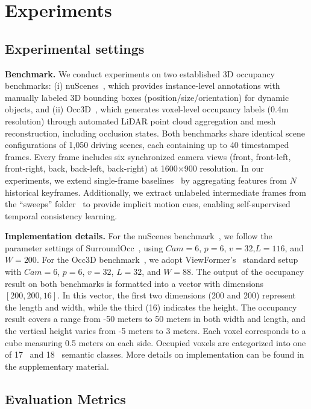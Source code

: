 \section{Experiments}
\label{sec:exp}
\subsection{Experimental settings}

\noindent\textbf{Benchmark.}  We conduct experiments on two established 3D occupancy benchmarks: (i) nuScenes~\cite{nuScenes}, which provides instance-level annotations with manually labeled 3D bounding boxes (position/size/orientation) for dynamic objects, and (ii) Occ3D~\cite{Occ3D}, which generates voxel-level occupancy labels (0.4m resolution) through automated LiDAR point cloud aggregation and mesh reconstruction, including occlusion states. Both benchmarks share identical scene configurations of 1,050 driving scenes, each containing up to 40 timestamped frames. Every frame includes six synchronized camera views (front, front-left, front-right, back, back-left, back-right) at 1600$\times$900 resolution. In our experiments, we extend single-frame baselines~\cite{MonoScene,surroundOcc,viewformer} by aggregating features from $N$ historical keyframes. Additionally, we extract unlabeled intermediate frames from the ``sweeps'' folder~\cite{nuScenes} to provide implicit motion cues, enabling self-supervised temporal consistency learning.

\noindent\textbf{Implementation details.} For the nuScenes benchmark~\cite{nuScenes}, we follow the parameter settings of SurroundOcc~\cite{surroundOcc}, using $Cam=6$, $p=6$, $v=32$,$L=116$, and $W=200$. For the Occ3D benchmark~\cite{Occ3D}, we adopt ViewFormer's~\cite{viewformer} standard setup with $Cam=6$, $p=6$, $v=32$, $L=32$, and $W=88$. The output of the occupancy result on both benchmarks is formatted into a vector with dimensions $[200, 200, 16]$. In this vector, the first two dimensions (200 and 200) represent the length and width, while the third (16) indicates the height. The occupancy result covers a range from -50 meters to 50 meters in both width and length, and the vertical height varies from -5 meters to 3 meters. Each voxel corresponds to a cube measuring 0.5 meters on each side. Occupied voxels are categorized into one of 17~\cite{nuScenes,surroundOcc} and 18~\cite{Occ3D} semantic classes.
More details on implementation can be found in the supplementary material.

\subsection{Evaluation Metrics}


